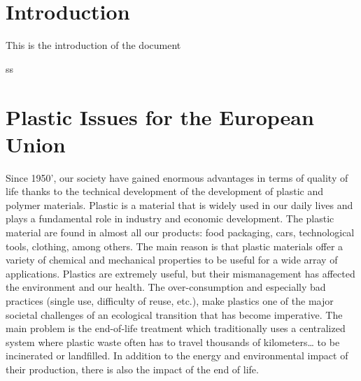 \documentclass[
  11pt,
]{article}
\renewcommand*\contentsname{Table of contents}
\newcommand\contentsname{Table of contents}
\begin{document}
\newpage

\ifdefined\Shaded\renewenvironment{Shaded}{\begin{tcolorbox}[interior hidden, borderline west={3pt}{0pt}{shadecolor}, frame hidden, enhanced, breakable, sharp corners, boxrule=0pt]}{\end{tcolorbox}}\fi

\renewcommand*\contentsname{Table of contents}
{
\hypersetup{linkcolor=}
\setcounter{tocdepth}{3}
\tableofcontents
}
\listoffigures
\color{darkgray}

\hypertarget{introduction}{%
\section{Introduction}\label{introduction}}

This is the introduction of the document

ss

\hypertarget{plastic-issues-for-the-european-union}{%
\section{Plastic Issues for the European
Union}\label{plastic-issues-for-the-european-union}}

Since 1950', our society have gained enormous advantages in terms of
quality of life thanks to the technical development of the development
of plastic and polymer materials. Plastic is a material that is widely
used in our daily lives and plays a fundamental role in industry and
economic development. The plastic material are found in almost all our
products: food packaging, cars, technological tools, clothing, among
others. The main reason is that plastic materials offer a variety of
chemical and mechanical properties to be useful for a wide array of
applications. Plastics are extremely useful, but their mismanagement has
affected the environment and our health. The over-consumption and
especially bad practices (single use, difficulty of reuse, etc.), make
plastics one of the major societal challenges of an ecological
transition that has become imperative. The main problem is the
end-of-life treatment which traditionally uses a centralized system
where plastic waste often has to travel thousands of kilometers\ldots{}
to be incinerated or landfilled. In addition to the energy and
environmental impact of their production, there is also the impact of
the end of life.
\end{document}
